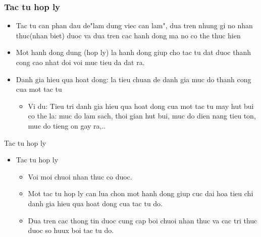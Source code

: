 \documentclass[12pt]{beamer}
\begin{document}
\begin{frame}
\frametitle{Tac tu hop ly}
\begin{itemize}
    \item Tac tu can phan dau de"lam dung viec can lam", dua tren nhung gi no nhan thuc(nhan biet) duoc va dua tren cac hanh dong ma no co the thuc hien\\
    \item Mot hanh dong dung (hop ly) la hanh dong giup cho tac tu dat duoc thanh cong cao nhat doi voi muc tieu da dat ra.\\
    \item Danh gia hieu qua hoat dong: la tieu chuan de danh gia muc do thanh cong cua mot tac tu\\
    \begin{itemize}
      \item  Vi du: Tieu tri danh gia hieu qua hoat dong cua mot tac tu may hut bui co the la: muc do lam sach, thoi gian hut bui, muc do dien nang tieu ton, muc do tieng on gay ra,..
    \end{itemize}
    
\end{itemize}
\end{frame}
\begin{frame}{Tac tu hop ly}
\begin{itemize}
    \item Tac tu hop ly\\
    \begin{itemize}
        \item Voi moi chuoi nhan thuc co duoc.\\
        \item Mot tac tu hop ly can lua chon mot hanh dong giup cuc dai hoa tieu chi danh gia hieu qua hoat dong cua tac tu do.\\
        \item Dua tren cac thong tin duoc cung cap boi chuoi nhan thuc va cac tri thuc duoc so huux boi tac tu do.\\
        
    \end{itemize}
\end{itemize}
\end{frame}
\end{document}
